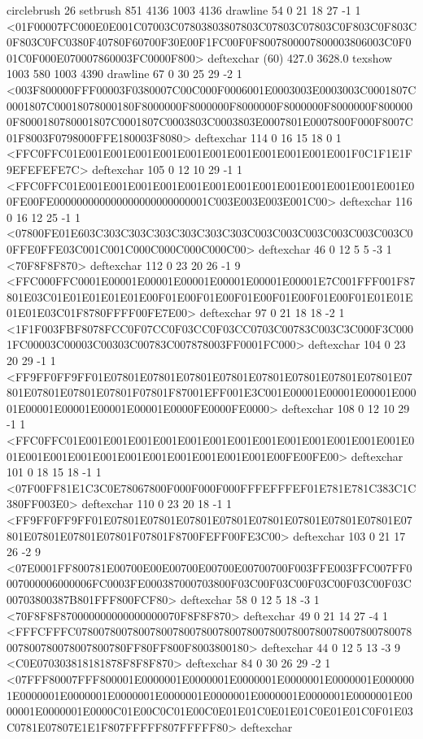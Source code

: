 circlebrush 26 setbrush
851 4136 1003 4136 drawline
54 0 21 18 27 -1 1 {{<01F00007FC000E0E001C07003C07803803807803C07803C07803C0F803C0F803C0F803C0FC0380F40780F60700F30E00F1FC00F0F8007800007800003806003C0F001C0F000E070007860003FC0000F800>}} deftexchar
(60) 427.0 3628.0 texshow
1003 580 1003 4390 drawline
67 0 30 25 29 -2 1 {{<003F800000FFF00003F0380007C00C000F0006001E0003003E0003003C0001807C0001807C00018078000180F8000000F8000000F8000000F8000000F8000000F8000000F8000180780001807C0001807C0003803C0003803E0007801E0007800F000F8007C01F8003F0798000FFE180003F8080>}} deftexchar
114 0 16 15 18 0 1 {{<FFC0FFC01E001E001E001E001E001E001E001E001E001E001E001F0C1F1E1F9EFEFEFE7C>}} deftexchar
105 0 12 10 29 -1 1 {{<FFC0FFC01E001E001E001E001E001E001E001E001E001E001E001E001E001E00FE00FE000000000000000000000000001C003E003E003E001C00>}} deftexchar
116 0 16 12 25 -1 1 {{<07800FE01E603C303C303C303C303C303C303C003C003C003C003C003C003C00FFE0FFE03C001C001C000C000C000C000C00>}} deftexchar
46 0 12 5 5 -3 1 {{<70F8F8F870>}} deftexchar
112 0 23 20 26 -1 9 {{<FFC000FFC0001E00001E00001E00001E00001E00001E00001E7C001FFF001F87801E03C01E01E01E01E01E00F01E00F01E00F01E00F01E00F01E00F01E01E01E01E01E03C01F8780FFFF00FE7E00>}} deftexchar
97 0 21 18 18 -2 1 {{<1F1F003FBF8078FCC0F07CC0F03CC0F03CC0703C00783C003C3C000F3C0001FC00003C00003C00303C00783C007878003FF0001FC000>}} deftexchar
104 0 23 20 29 -1 1 {{<FF9FF0FF9FF01E07801E07801E07801E07801E07801E07801E07801E07801E07801E07801E07801E07801F07801F87001EFF001E3C001E00001E00001E00001E00001E00001E00001E00001E00001E0000FE0000FE0000>}} deftexchar
108 0 12 10 29 -1 1 {{<FFC0FFC01E001E001E001E001E001E001E001E001E001E001E001E001E001E001E001E001E001E001E001E001E001E001E001E001E00FE00FE00>}} deftexchar
101 0 18 15 18 -1 1 {{<07F00FF81E1C3C0E78067800F000F000F000FFFEFFFEF01E781E781C383C1C380FF003E0>}} deftexchar
110 0 23 20 18 -1 1 {{<FF9FF0FF9FF01E07801E07801E07801E07801E07801E07801E07801E07801E07801E07801E07801E07801F07801F8700FEFF00FE3C00>}} deftexchar
103 0 21 17 26 -2 9 {{<07E0001FF800781E00700E00E00700E00700E00700700F003FFE003FFC007FF0007000006000006FC0003FE000387000703800F03C00F03C00F03C00F03C00F03C00703800387B801FFF800FCF80>}} deftexchar
58 0 12 5 18 -3 1 {{<70F8F8F870000000000000000070F8F8F870>}} deftexchar
49 0 21 14 27 -4 1 {{<FFFCFFFC07800780078007800780078007800780078007800780078007800780078007800780078007800780FF80FF800F8003800180>}} deftexchar
44 0 12 5 13 -3 9 {{<C0E070303818181878F8F8F870>}} deftexchar
84 0 30 26 29 -2 1 {{<07FFF80007FFF800001E0000001E0000001E0000001E0000001E0000001E0000001E0000001E0000001E0000001E0000001E0000001E0000001E0000001E0000001E0000001E0000001E0000C01E00C0C01E00C0E01E01C0E01E01C0E01E01C0F01E03C0781E07807E1E1F807FFFFF807FFFFF80>}} deftexchar

